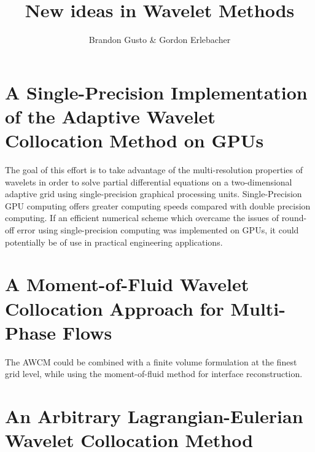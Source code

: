 \documentclass[11pt]{article}
\begin{document}
\title{New ideas in Wavelet Methods}
\author{Brandon Gusto \& Gordon Erlebacher}

\maketitle

\section{A Single-Precision Implementation of the Adaptive Wavelet Collocation Method on GPUs}
    The goal of this effort is to take advantage of the multi-resolution properties of wavelets in order
    to solve partial differential equations on a two-dimensional adaptive grid using single-precision
    graphical processing units. Single-Precision GPU computing offers greater computing speeds compared
    with double precision computing. If an efficient numerical scheme which overcame the issues of
    round-off error using single-precision computing was implemented on GPUs, it could potentially be of
    use in practical engineering applications.
\section{A Moment-of-Fluid Wavelet Collocation Approach for Multi-Phase Flows}
    The AWCM could be combined with a finite volume formulation at the finest grid level, while using 
    the moment-of-fluid method for interface reconstruction.
	
\section{An Arbitrary Lagrangian-Eulerian Wavelet Collocation Method}
\end{document}
